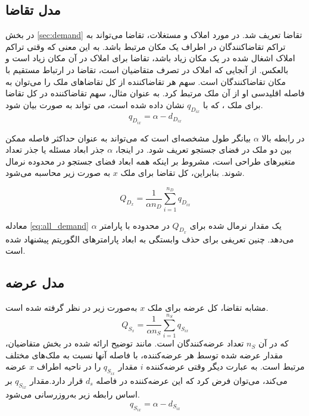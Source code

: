 \subsection{مدل تقاضا}\label{sec:demand_model}
در بخش
\ref{sec:demand}
تقاضا تعریف شد.
در مورد املاک و مستغلات، تقاضا می‌تواند به تراکم تقاضا‌کنندگان در اطراف یک مکان مرتبط باشد. به این معنی که وقتی تراکم املاک اشغال شده در یک مکان زیاد باشد، تقاضا برای املاک در آن مکان زیاد است و بالعکس. از آنجایی که املاک در تصرف متقاضیان است، تقاضا در ارتباط مستقیم با مکان تقاضاکنندگان است. سهم هر تقاضاکننده از کل تقاضاهای ملک را می‌توان به فاصله اقلیدسی او از آن ملک مرتبط کرد. به عنوان مثال، سهم تقاضاکننده  در کل تقاضا برای ملک ، که با $q_{D_{ix}}$ نشان داده شده است، می تواند به صورت بیان شود.
\begin{equation}
	q_{D_{ix}} = \alpha - d_{D_{ix}}
\end{equation}

در رابطه بالا $\alpha$ بیانگر طول مشخصه‌ای است که می‌تواند به عنوان حداکثر فاصله ممکن بین دو ملک در فضای جستجو تعریف شود. در اینجا، $\alpha$ جذر ابعاد مسئله یا جذر تعداد متغیرهای طراحی است، مشروط بر اینکه همه ابعاد فضای جستجو در محدوده \lr{$[0, 1]$} نرمال شوند. بنابراین، کل تقاضا برای ملک $x$ به صورت زیر محاسبه می‌شود.

\begin{equation}\label{eq:all_demand}
	Q_{D_x} = \dfrac{1}{\alpha n_D} \sum_{i=1}^{n_D}q_{D_{ix}} 
\end{equation}

معادله \eqref{eq:all_demand} یک مقدار نرمال شده برای $	Q_{D_x} $ در محدوده \lr{$[0, 1]$}  با پارامتر $\alpha$ می‌دهد. چنین تعریفی برای حذف وابستگی به ابعاد پارامترهای الگوریتم پیشنهاد شده است.

\subsection{مدل عرضه}
مشابه تقاضا، کل عرضه برای ملک $x$ به‌صورت زیر در نظر گرفته شده است.
\begin{equation}\label{eq:all_supply}
	Q_{S_x} = \dfrac{1}{\alpha n_S} \sum_{i=1}^{n_S}q_{S_{ix}} 
\end{equation}
که در آن $n_S$ تعداد عرضه‌کنندگان است. مانند توضیح ارائه شده در بخش متقاضیان، مقدار عرضه شده توسط هر ‌عرضه‌کننده، با فاصله آنها نسبت به ملک‌های مختلف مرتبط است. به عبارت دیگر وقتی عرضه‌کننده
 $i$ 
مقدار
 $q_{S_{ix}}$ 
 را در ناحیه اطراف $x$ عرضه می‌کند، می‌توان فرض کرد که این ‌عرضه‌کننده در فاصله $d_s$ قرار دارد.مقدار
 $q_{S_{ix}}$ 
 بر اساس رابطه زیر به‌روزرسانی می‌شود.
\begin{equation}
	q_{S_{ix}} = \alpha - d_{S_{ix}}
\end{equation}

